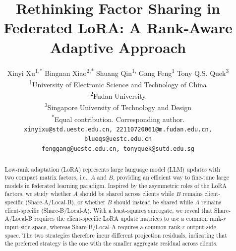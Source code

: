 \documentclass[lettersize,journal]{IEEEtran}
\title{Rethinking Factor Sharing in Federated LoRA: A Rank-Aware Adaptive Approach}
\author{
Xinyi Xu\textsuperscript{1,*}\quad
Bingnan Xiao\textsuperscript{2,*}\quad
Shuang Qin\textsuperscript{1,\textdagger}\quad
Gang Feng\textsuperscript{1}\quad
Tony Q.S. Quek\textsuperscript{3}\\[0.5em]
\small \textsuperscript{1}University of Electronic Science and Technology of China\\
\small \textsuperscript{2}Fudan University\\
\small \textsuperscript{3}Singapore University of Technology and Design\\[0.25em]
\small \textsuperscript{*}Equal contribution.\quad
\textsuperscript{\textdagger}Corresponding author.\\[0.25em]
\small \texttt{xinyixu@std.uestc.edu.cn, 22110720061@m.fudan.edu.cn, blueqs@uestc.edu.cn}\\
\small \texttt{fenggang@uestc.edu.cn, tonyquek@sutd.edu.sg}
}
\date{}
\begin{document}
	
	\maketitle
	
	\begin{abstract}
		Low-rank adaptation (LoRA) represents large language model (LLM) updates with two compact matrix factors, i.e., $A$ and $B$, providing an efficient way to fine-tune large models in federated learning paradigm. 
		Inspired by the asymmetric roles of the LoRA factors, we study whether $A$ should be shared across clients while $B$ remains client-specific (Share-A/Local-B), or whether $B$ should instead be shared while $A$ remains client-specific (Share-B/Local-A).
		With a least-squares surrogate, we reveal that Share-A/Local-B requires the client-specific LoRA update matrices to use a common rank-$r$ input-side space, whereas Share-B/Local-A requires a common rank-$r$ output-side space. 
		The two strategies therefore incur different projection residuals, indicating that the preferred strategy is the one with the smaller aggregate residual across clients. 

\end{abstract}
\end{document}
